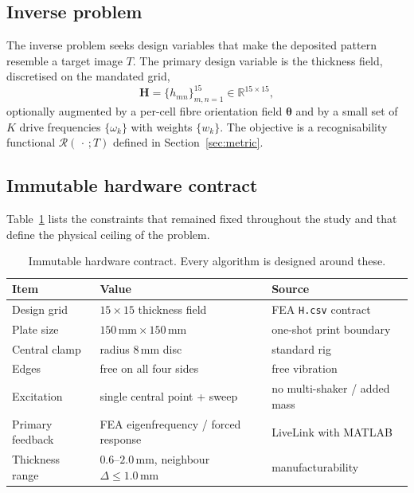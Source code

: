 \documentclass[11pt,a4paper]{article}
\newcommand{\matH}{\mathbf{H}}
\begin{document}
\subsection{Inverse problem}
The inverse problem seeks design variables that make the deposited pattern
resemble a target image $T$. The primary design variable is the thickness field,
discretised on the mandated grid,
\begin{equation}
\matH=\{h_{mn}\}_{m,n=1}^{15}\in\mathbb{R}^{15\times15},
\end{equation}
optionally augmented by a per-cell fibre orientation field $\bm{\theta}$ and by a
small set of $K$ drive frequencies $\{\omega_k\}$ with weights $\{w_k\}$. The
objective is a recognisability functional $\mathcal{R}(\,\cdot\,;T)$ defined in
Section~\ref{sec:metric}.

\subsection{Immutable hardware contract}
Table~\ref{tab:contract} lists the constraints that remained fixed throughout the
study and that define the physical ceiling of the problem.

\begin{table}[h]
\centering
\caption{Immutable hardware contract. Every algorithm is designed around these.}
\label{tab:contract}
\small
\begin{tabular}{@{}lll@{}}
\toprule
Item & Value & Source \\
\midrule
Design grid          & $15\times15$ thickness field        & FEA \texttt{H.csv} contract \\
Plate size           & $150\,\text{mm}\times150\,\text{mm}$ & one-shot print boundary \\
Central clamp        & radius $8\,\text{mm}$ disc          & standard rig \\
Edges                & free on all four sides              & free vibration \\
Excitation           & single central point + sweep        & no multi-shaker / added mass \\
Primary feedback     & FEA eigenfrequency / forced response& LiveLink with MATLAB \\
Thickness range      & $0.6$--$2.0\,\text{mm}$, neighbour $\Delta\le1.0\,\text{mm}$ & manufacturability \\
\bottomrule
\end{tabular}
\end{table}
\end{document}
